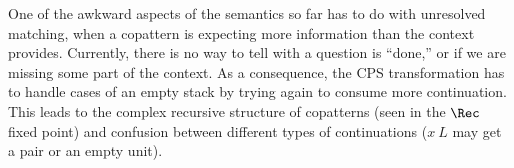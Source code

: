 \documentclass[sigplan,screen]{acmart}
\begin{document}



One of the awkward aspects of the semantics so far has to do with unresolved
matching, when a copattern is expecting more information than the context
provides.  Currently, there is no way to tell with a question is ``done,'' or if
we are missing some part of the context.  As a consequence, the CPS
transformation has to handle cases of an empty stack by trying again to consume
more continuation.  This leads to the complex recursive structure of copatterns
(seen in the $\Rec$ fixed point) and confusion between different types of
continuations (\eg $x~L$ may get a pair or an empty unit).
\end{document}
